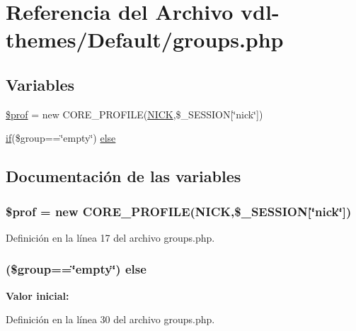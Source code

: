 \hypertarget{groups_8php}{\section{Referencia del Archivo vdl-\/themes/\-Default/groups.php}
\label{groups_8php}
}
\subsection*{Variables}
\begin{DoxyCompactItemize}
\item 
\hyperlink{groups_8php_afc82c0503a0f9de571d472f38245e934}{\$prof} = new C\-O\-R\-E\-\_\-\-P\-R\-O\-F\-I\-L\-E(\hyperlink{set__update_8php_abdd850ab3ab0275cf56392a54ffb3af9}{N\-I\-C\-K},\$\-\_\-\-S\-E\-S\-S\-I\-O\-N\mbox{[}\char`\"{}nick\char`\"{}\mbox{]})
\item 
\hyperlink{index_8php_a03ed0eadab502a2cb754ef4963570e97}{if}(\$group==\char`\"{}empty\char`\"{}) \hyperlink{groups_8php_a88f0c6b924aa990ea8ecc6fbad90bd6a}{else}
\end{DoxyCompactItemize}


\subsection{Documentación de las variables}
\hypertarget{groups_8php_afc82c0503a0f9de571d472f38245e934}{
\subsubsection[{\$prof}]{\setlength{\rightskip}{0pt plus 5cm}\$prof = new C\-O\-R\-E\-\_\-\-P\-R\-O\-F\-I\-L\-E({\bf N\-I\-C\-K},\$\-\_\-\-S\-E\-S\-S\-I\-O\-N\mbox{[}\char`\"{}nick\char`\"{}\mbox{]})}}\label{groups_8php_afc82c0503a0f9de571d472f38245e934}


Definición en la línea 17 del archivo groups.\-php.

\hypertarget{groups_8php_a88f0c6b924aa990ea8ecc6fbad90bd6a}{
\subsubsection[{else}]{ (\$group==\char`\"{}empty\char`\"{}) else}}\label{groups_8php_a88f0c6b924aa990ea8ecc6fbad90bd6a}
{\bfseries Valor inicial\-:}


Definición en la línea 30 del archivo groups.\-php.

